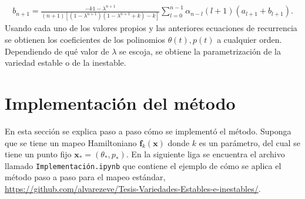 \begin{eqnarray}
b_{n+1}=\frac{-k 1-\lambda^{n+1}}{(n+1)[(1-\lambda^{n+1})(1-\lambda^{n+1}+k)-k]}\sum_{l=0}^{n-1}\alpha_{n-l}(l+1)(a_{l+1}+b_{l+1}).
\end{eqnarray}
Usando cada uno de los valores propios y las anteriores ecuaciones de recurrencia se obtienen los coeficientes de los polinomios $\theta(t),p(t)$ a cualquier orden. Dependiendo de qué valor de $\lambda$ se escoja, se obtiene la parametrización de la variedad estable o de la inestable.\\





\section{Implementación del método}
En esta sección se explica paso a paso cómo se implementó el método. Su\-pon\-ga que se tiene un mapeo Hamiltoniano $\mathbf{f}_{k}(\mathbf{x})$ donde $k$  es un parámetro, del cual se tiene un punto fijo $\mathbf{x}_{*}=(\theta_{*},p_{*})$. En la siguiente liga se encuentra el archivo llamado \texttt{Implementación.ipynb} que contiene el ejemplo de cómo se aplica el método paso a paso para el mapeo estándar, \url{https://github.com/alvarezeve/Tesis-Variedades-Estables-e-inestables/}. 
\linebreak


